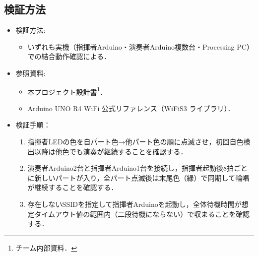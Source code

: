 \documentclass[lualatex,paper=a4paper,jafontsize=11.5pt,jafontscale=1.05]{jlreq}
\begin{document}
\subsection{検証方法}
\begin{itemize}
  \item 検証方法:
  \begin{itemize}
      \item いずれも実機（指揮者Arduino・演奏者Arduino複数台・Processing PC）での結合動作確認による．
  \end{itemize}
  \item 参照資料:
  \begin{itemize}
      \item 本プロジェクト設計書\footnote{チーム内部資料．}．
      \item Arduino UNO R4 WiFi 公式リファレンス（WiFiS3 ライブラリ）\cite{wifis3}．
  \end{itemize}
  \item 検証手順：
  \begin{enumerate}
      \item 指揮者LEDの色を自パート色→他パート色の順に点滅させ，初回自色検出以降は他色でも演奏が継続することを確認する．
      \item 演奏者Arduino2台と指揮者Arduino1台を接続し，指揮者起動後8拍ごとに新しいパートが入り，全パート点滅後は末尾色（緑）で同期して輪唱が継続することを確認する．
      \item 存在しないSSIDを指定して指揮者Arduinoを起動し，全体待機時間が想定タイムアウト値の範囲内（二段待機にならない）で収まることを確認する．
  \end{enumerate}
\end{itemize}
\end{document}
